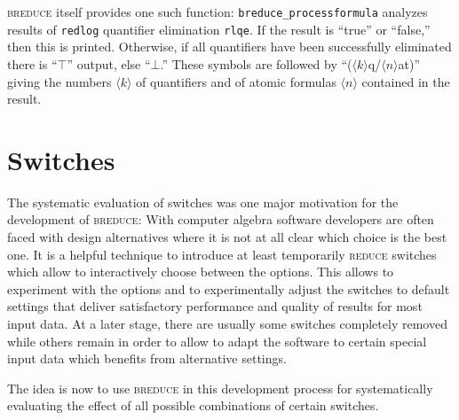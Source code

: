\documentclass[a4paper]{article}
\begin{document}
\textsc{breduce} itself provides one such function:
\texttt{breduce\_process\-formula} analyzes results of \texttt{redlog}
\cite{DolzmannSturm:97a} quantifier elimination \texttt{rlqe}. If the
result is ``true'' or ``false,'' then this is printed. Otherwise, if
all quantifiers have been successfully eliminated there is ``$\top$''
output, else ``$\bot$.'' These symbols are followed by ``($\langle
k\rangle$q/$\langle n\rangle$at)'' giving the numbers $\langle
k\rangle$ of quantifiers and of atomic formulas $\langle n\rangle$
contained in the result.

\section{Switches}\label{SE:switches}
The systematic evaluation of switches was one major motivation for the
development of \textsc{breduce}: With computer algebra software
developers are often faced with design alternatives where it is not at
all clear which choice is the best one. It is a helpful technique to
introduce at least temporarily \textsc{reduce} switches which allow to
interactively choose between the options. This allows to experiment
with the options and to experimentally adjust the switches to default
settings that deliver satisfactory performance and quality of results
for most input data. At a later stage, there are usually some switches
completely removed while others remain in order to allow to adapt the
software to certain special input data which benefits from alternative
settings.

The idea is now to use \textsc{breduce} in this development process
for systematically evaluating the effect of all possible combinations
of certain switches.
\end{document}
